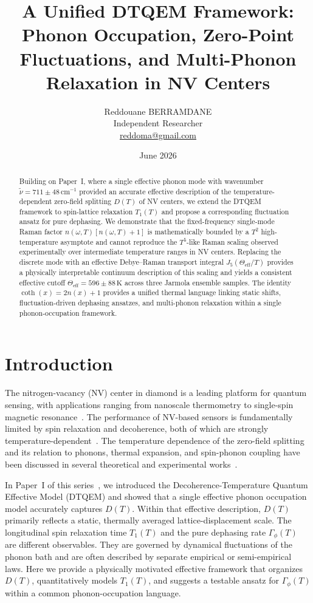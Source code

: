 \documentclass[12pt,a4paper]{article}
\title{\textbf{A Unified DTQEM Framework: Phonon Occupation, Zero-Point Fluctuations, and Multi-Phonon Relaxation in NV Centers}}
\author{Reddouane BERRAMDANE\\\small Independent Researcher\\\small \href{mailto:reddoma@gmail.com}{reddoma@gmail.com}}
\date{June 2026}
\begin{document}
\maketitle

\begin{abstract}
Building on Paper~I, where a single effective phonon mode with wavenumber $\tilde{\nu}=711\pm48\,\mathrm{cm}^{-1}$ provided an accurate effective description of the temperature-dependent zero-field splitting $D(T)$ of NV centers, we extend the DTQEM framework to spin-lattice relaxation $T_1(T)$ and propose a corresponding fluctuation ansatz for pure dephasing. We demonstrate that the fixed-frequency single-mode Raman factor $n(\omega,T)[n(\omega,T)+1]$ is mathematically bounded by a $T^2$ high-temperature asymptote and cannot reproduce the $T^5$-like Raman scaling observed experimentally over intermediate temperature ranges in NV centers. Replacing the discrete mode with an effective Debye--Raman transport integral $J_5(\Theta_{\mathrm{eff}}/T)$ provides a physically interpretable continuum description of this scaling and yields a consistent effective cutoff $\Theta_{\mathrm{eff}}=596\pm88\,\mathrm{K}$ across three Jarmola ensemble samples. The identity $\coth(x)=2n(x)+1$ provides a unified thermal language linking static shifts, fluctuation-driven dephasing ansatzes, and multi-phonon relaxation within a single phonon-occupation framework.
\end{abstract}

\section{Introduction}
The nitrogen-vacancy (NV) center in diamond is a leading platform for quantum sensing, with applications ranging from nanoscale thermometry to single-spin magnetic resonance~\cite{Degen2017,Barry2020}. The performance of NV-based sensors is fundamentally limited by spin relaxation and decoherence, both of which are strongly temperature-dependent~\cite{Jarmola2012,Norambuena2018}. The temperature dependence of the zero-field splitting and its relation to phonons, thermal expansion, and spin-phonon coupling have been discussed in several theoretical and experimental works~\cite{Doherty2014,Cambria2024}.

In Paper~I of this series~\cite{Berramdane2026a}, we introduced the Decoherence-Temperature Quantum Effective Model (DTQEM) and showed that a single effective phonon occupation model accurately captures $D(T)$. Within that effective description, $D(T)$ primarily reflects a static, thermally averaged lattice-displacement scale. The longitudinal spin relaxation time $T_1(T)$ and the pure dephasing rate $\Gamma_\phi(T)$ are different observables. They are governed by dynamical fluctuations of the phonon bath and are often described by separate empirical or semi-empirical laws. Here we provide a physically motivated effective framework that organizes $D(T)$, quantitatively models $T_1(T)$, and suggests a testable ansatz for $\Gamma_\phi(T)$ within a common phonon-occupation language.
\end{document}
